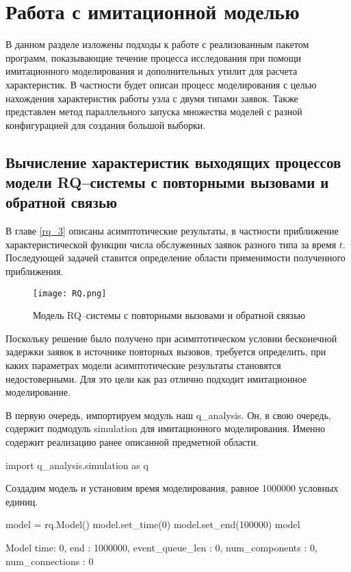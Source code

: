 \section{Работа с имитационной моделью}
В данном разделе изложены подходы к работе с реализованным пакетом программ, показывающие течение процесса исследования при помощи имитационного моделирования и дополнительных утилит для расчета характеристик. В частности будет описан процесс моделирования с целью нахождения характеристик работы узла с двумя типами заявок. Также представлен метод параллельного запуска множества моделей с разной конфигурацией для создания большой выборки.
\subsection{Вычисление характеристик выходящих процессов модели RQ--системы с повторными вызовами и обратной связью}

В главе \ref{rq_3} описаны асимптотические результаты, в частности приближение характеристической функции числа обслуженных заявок разного типа за время $t$. Последующей задачей ставится определение области применимости полученного приближения. 

\begin{figure}[H]
	\centering
	\texttt{[image: RQ.png]}
	\caption{Модель RQ--системы с повторными вызовами и обратной связью} \label{rq_system}
\end{figure}

Поскольку решение было получено при асимптотическом условии бесконечной задержки заявок в источнике повторных вызовов, требуется определить, при каких параметрах модели асимптотические результаты становятся недостоверными. Для это цели как раз отлично подходит имитационное моделирование.

В первую очередь, импортируем модуль наш q\_analysis. Он, в свою очередь, содержит подмодуль simulation для имитационного моделирования. Именно содержит реализацию ранее описанной предметной области.
\begin{pyin}
	import q_analysis.simulation as q
\end{pyin}
Создадим модель и установим время моделирования, равное 1000000 условных единиц.
\begin{pyin} 
model = rq.Model()
model.set_time(0) 
model.set_end(100000)
model
\end{pyin}

\begin{pyout}
	Model{ time: 0, end : 1000000, event_queue_len : 0, num_components : 0, num_connections : 0 }
\end{pyout}

